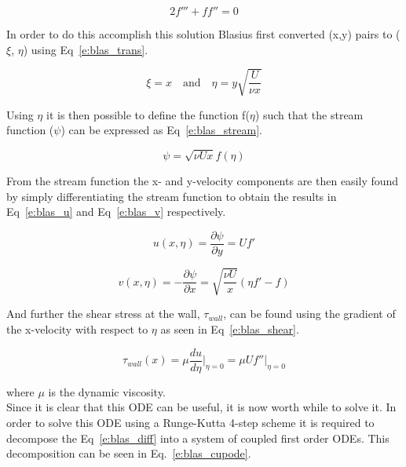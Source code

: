 \documentclass[]{aiaa-tc}%
\begin{document}
\begin{equation}
  \label{e:blas_diff}
  2 f''' + f f'' = 0
\end{equation}

In order to do this accomplish this solution Blasius first converted (x,y) pairs
to ($\xi$, $\eta$) using Eq~\ref{e:blas_trans}.

\begin{equation}
  \label{e:blas_trans}
  \xi = x \quad \textrm{and} \quad \eta = y \sqrt{\frac{U}{\nu x}}
\end{equation}

Using $\eta$ it is then possible to define the function f($\eta$) such that the stream
function ($\psi$) can be expressed as Eq~\ref{e:blas_stream}.

\begin{equation}
  \label{e:blas_stream}
  \psi = \sqrt{\nu U x} f(\eta)
\end{equation}

From the stream function the x- and y-velocity components are then easily found
by simply differentiating the stream function to obtain the results in Eq~\ref{e:blas_u}
and Eq~\ref{e:blas_v} respectively.

\begin{equation}
  \label{e:blas_u}
  u(x,\eta) = \frac{\partial \psi}{\partial y} = U f'
\end{equation}

\begin{equation}
  \label{e:blas_v}
  v(x,\eta) = -\frac{\partial \psi}{\partial x} = \sqrt{\frac{\nu U}{x}} (\eta f' - f)
\end{equation}

And further the shear stress at the wall, $\tau_{wall}$, can be found using the
gradient of the x-velocity with respect to $\eta$ as seen in Eq~\ref{e:blas_shear}.

\begin{equation}
  \label{e:blas_shear}
  \tau_{wall}(x) = \mu \frac{d u}{d \eta} \vert_{\eta=0} = \mu U f''\vert_{\eta=0}
\end{equation}

where $\mu$ is the dynamic viscosity. \\

Since it is clear that this ODE can be useful, it is now worth while to solve it.
In order to solve this ODE using a Runge-Kutta 4-step scheme it is required to
decompose the Eq~\ref{e:blas_diff} into a system of coupled first order ODEs.
This decomposition can be seen in Eq.~\ref{e:blas_cupode}.
\end{document}
